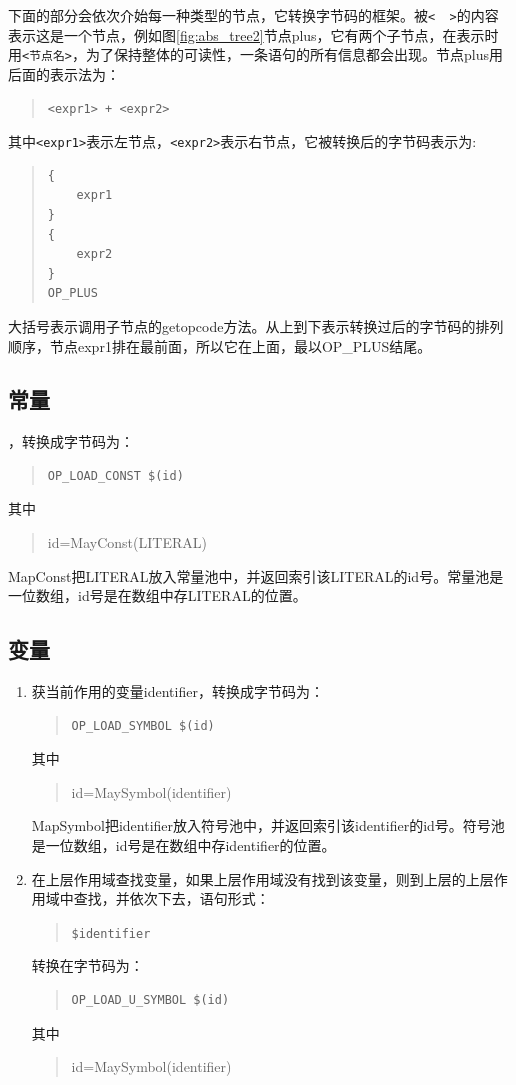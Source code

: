 下面的部分会依次介始每一种类型的节点，它转换字节码的框架。被\verb|<  >|的内容表示这是一个节点，例如图\ref{fig:abs_tree2}节点plus，它有两个子节点，在表示时用\verb|<节点名>|，为了保持整体的可读性，一条语句的所有信息都会出现。节点plus用后面的表示法为：
\begin{quote}
\begin{verbatim}
<expr1> + <expr2> 
\end{verbatim}
\end{quote}
其中\verb|<expr1>|表示左节点，\verb|<expr2>|表示右节点，它被转换后的字节码表示为:
\begin{quote}
\begin{verbatim}
{
    expr1
}
{
    expr2
}
OP_PLUS
\end{verbatim}
\end{quote}
大括号表示调用子节点的getopcode方法。从上到下表示转换过后的字节码的排列顺序，节点expr1排在最前面，所以它在上面，最以OP\_PLUS结尾。

\subsection{常量}
，转换成字节码为：
\begin{quote}
\begin{verbatim}
OP_LOAD_CONST $(id)
\end{verbatim}
\end{quote}
其中
\begin{quote}
id=MayConst(LITERAL)
\end{quote}
MapConst把LITERAL放入常量池中，并返回索引该LITERAL的id号。常量池是一位数组，id号是在数组中存LITERAL的位置。

\subsection{变量}
\begin{enumerate}
\item 获当前作用的变量identifier，转换成字节码为：
\begin{quote}
\begin{verbatim}
OP_LOAD_SYMBOL $(id)
\end{verbatim}
\end{quote}
其中
\begin{quote}
id=MaySymbol(identifier)
\end{quote}
MapSymbol把identifier放入符号池中，并返回索引该identifier的id号。符号池是一位数组，id号是在数组中存identifier的位置。

\item 在上层作用域查找变量，如果上层作用域没有找到该变量，则到上层的上层作用域中查找，并依次下去，语句形式：
\begin{quote}
\verb|$identifier|
\end{quote}
转换在字节码为：
\begin{quote}
\begin{verbatim}
OP_LOAD_U_SYMBOL $(id)
\end{verbatim}
\end{quote}
其中
\begin{quote}
id=MaySymbol(identifier)
\end{quote}
\end{enumerate}

